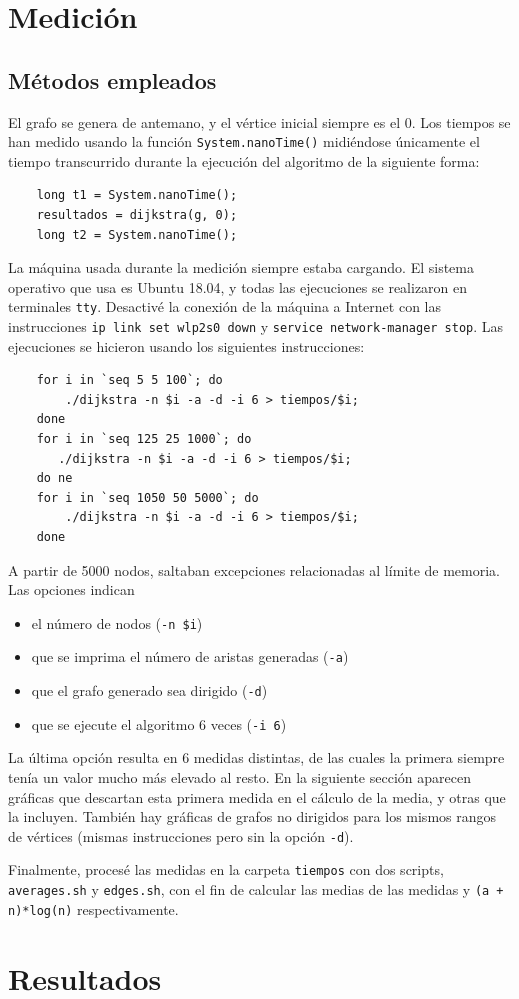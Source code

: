 \documentclass[12pt , a4paper]{article}
\begin{document}
\section{Medición}
\subsection{Métodos empleados}
	El grafo se genera de antemano, y el vértice inicial siempre es el 0. Los tiempos se han medido usando la función \texttt{System.nanoTime()} midiéndose únicamente el tiempo transcurrido durante la ejecución del algoritmo de la siguiente forma:
	\begin{verbatim}
	long t1 = System.nanoTime();
	resultados = dijkstra(g, 0);
	long t2 = System.nanoTime();
	\end{verbatim}
	
	La máquina usada durante la medición siempre estaba cargando. El sistema operativo que usa es Ubuntu 18.04, y todas las ejecuciones se realizaron en terminales \texttt{tty}. Desactivé la conexión de la máquina a Internet con las instrucciones \texttt{ip link set wlp2s0 down} y \texttt{service network-manager stop}. Las ejecuciones se hicieron usando los siguientes instrucciones:
	\begin{verbatim}
	for i in `seq 5 5 100`; do 
	    ./dijkstra -n $i -a -d -i 6 > tiempos/$i; 
	done
	for i in `seq 125 25 1000`; do 
	   ./dijkstra -n $i -a -d -i 6 > tiempos/$i;
	do ne
	for i in `seq 1050 50 5000`; do 
	    ./dijkstra -n $i -a -d -i 6 > tiempos/$i; 
	done
	\end{verbatim}
	A partir de 5000 nodos, saltaban excepciones relacionadas al límite de memoria. Las opciones indican
	\begin{itemize}
		\item el número de nodos (\texttt{-n \$i})
		\item que se imprima el número de aristas generadas (\texttt{-a})
		\item que el grafo generado sea dirigido (\texttt{-d})
		\item que se ejecute el algoritmo 6 veces (\texttt{-i 6})
	\end{itemize} 
	La última opción resulta en 6 medidas distintas, de las cuales la primera siempre tenía un valor mucho más elevado al resto. En la siguiente sección aparecen gráficas que descartan esta primera medida en el cálculo de la media, y otras que la incluyen. También hay gráficas de grafos no dirigidos para los mismos rangos de vértices (mismas instrucciones pero sin la opción \texttt{-d}).
	
	Finalmente, procesé las medidas en la carpeta \texttt{tiempos} con dos scripts, \texttt{averages.sh} y \texttt{edges.sh}, con el fin de calcular las medias de las medidas y \texttt{(a + n)*log(n)} respectivamente.
	
\section{Resultados}
\end{document}
